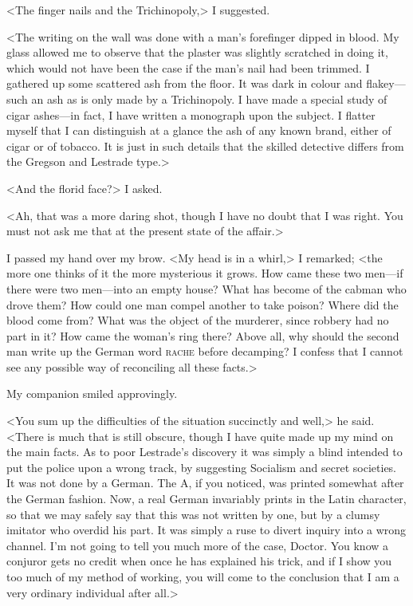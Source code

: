 <The finger nails and the Trichinopoly,> I suggested.

<The writing on the wall was done with a man's forefinger dipped in blood. My glass allowed me to observe that the plaster was slightly scratched in doing it, which would not have been the case if the man's nail had been trimmed. I gathered up some scattered ash from the floor. It was dark in colour and flakey—such an ash as is only made by a Trichinopoly. I have made a special study of cigar ashes—in fact, I have written a monograph upon the subject. I flatter myself that I can distinguish at a glance the ash of any known brand, either of cigar or of tobacco. It is just in such details that the skilled detective differs from the Gregson and Lestrade type.>

<And the florid face?> I asked.

<Ah, that was a more daring shot, though I have no doubt that I was right. You must not ask me that at the present state of the affair.>

I passed my hand over my brow. <My head is in a whirl,> I remarked; <the more one thinks of it the more mysterious it grows. How came these two men—if there were two men—into an empty house? What has become of the cabman who drove them? How could one man compel another to take poison? Where did the blood come from? What was the object of the murderer, since robbery had no part in it? How came the woman's ring there? Above all, why should the second man write up the German word \textsc{rache} before decamping? I confess that I cannot see any possible way of reconciling all these facts.>

My companion smiled approvingly.

<You sum up the difficulties of the situation succinctly and well,> he said. <There is much that is still obscure, though I have quite made up my mind on the main facts. As to poor Lestrade's discovery it was simply a blind intended to put the police upon a wrong track, by suggesting Socialism and secret societies. It was not done by a German. The A, if you noticed, was printed somewhat after the German fashion. Now, a real German invariably prints in the Latin character, so that we may safely say that this was not written by one, but by a clumsy imitator who overdid his part. It was simply a ruse to divert inquiry into a wrong channel. I'm not going to tell you much more of the case, Doctor. You know a conjuror gets no credit when once he has explained his trick, and if I show you too much of my method of working, you will come to the conclusion that I am a very ordinary individual after all.>

